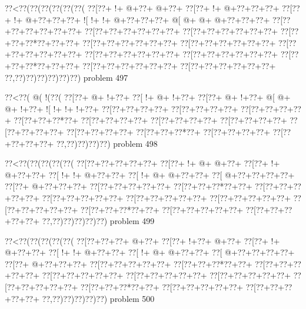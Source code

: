 \vbox{\vbox{\goo
\0??<\0??(\0??(\0??(\0??(\0??(\0??(
\0??[\0??+\- !+\- @+\0??+\- @+\0??+
\0??[\0??+\- !+\- @+\0??+\0??+\0??+
\0??[\0??+\- !+\- @+\0??+\0??+\0??+
\- ![\- !+\- !+\- @+\0??+\0??+\0??+
\- @[\- @+\- @+\- @+\0??+\0??+\0??+
\0??[\0??+\0??+\0??+\0??+\0??+\0??+
\0??[\0??+\0??+\0??+\0??+\0??+\0??+
\0??[\0??+\0??+\0??+\0??+\0??+\0??+
\0??[\0??+\0??+\0??*\0??+\0??+\0??+
\0??[\0??+\0??+\0??+\0??+\0??+\0??+
\0??[\0??+\0??+\0??+\0??+\0??+\0??+
\0??[\0??+\0??+\0??+\0??+\0??+\0??+
\0??[\0??+\0??+\0??+\0??+\0??+\0??+
\0??[\0??+\0??+\0??+\0??+\0??+\0??+
\0??[\0??+\0??+\0??*\0??+\0??+\0??+
\0??[\0??+\0??+\0??+\0??+\0??+\0??+
\0??[\0??+\0??+\0??+\0??+\0??+\0??+
\0??,\0??)\0??)\0??)\0??)\0??)\0??)
}
\hfil problem 497\hfil\break
}

\vbox{\vbox{\goo
\0??<\0??(\- @(\- !(\0??(
\0??[\0??+\- @+\- !+\0??+
\0??[\- !+\- @+\- !+\0??+
\0??[\0??+\- @+\- !+\0??+
\- @[\- @+\- @+\- !+\0??+
\- ![\- !+\- !+\- !+\0??+
\0??[\0??+\0??+\0??+\0??+
\0??[\0??+\0??+\0??+\0??+
\0??[\0??+\0??+\0??+\0??+
\0??[\0??+\0??+\0??*\0??+
\0??[\0??+\0??+\0??+\0??+
\0??[\0??+\0??+\0??+\0??+
\0??[\0??+\0??+\0??+\0??+
\0??[\0??+\0??+\0??+\0??+
\0??[\0??+\0??+\0??+\0??+
\0??[\0??+\0??+\0??*\0??+
\0??[\0??+\0??+\0??+\0??+
\0??[\0??+\0??+\0??+\0??+
\0??,\0??)\0??)\0??)\0??)
}
\hfil problem 498\hfil\break
}

\vbox{\vbox{\goo
\0??<\0??(\0??(\0??(\0??(\0??(
\0??[\0??+\0??+\0??+\0??+\0??+
\0??[\0??+\- !+\- @+\- @+\0??+
\0??[\0??+\- !+\- @+\0??+\0??+
\0??[\- !+\- !+\- @+\0??+\0??+
\0??[\- !+\- @+\- @+\0??+\0??+
\0??[\- @+\0??+\0??+\0??+\0??+
\0??[\0??+\- @+\0??+\0??+\0??+
\0??[\0??+\0??+\0??+\0??+\0??+
\0??[\0??+\0??+\0??*\0??+\0??+
\0??[\0??+\0??+\0??+\0??+\0??+
\0??[\0??+\0??+\0??+\0??+\0??+
\0??[\0??+\0??+\0??+\0??+\0??+
\0??[\0??+\0??+\0??+\0??+\0??+
\0??[\0??+\0??+\0??+\0??+\0??+
\0??[\0??+\0??+\0??*\0??+\0??+
\0??[\0??+\0??+\0??+\0??+\0??+
\0??[\0??+\0??+\0??+\0??+\0??+
\0??,\0??)\0??)\0??)\0??)\0??)
}
\hfil problem 499\hfil\break
}

\vbox{\vbox{\goo
\0??<\0??(\0??(\0??(\0??(\0??(
\0??[\0??+\0??+\0??+\- @+\0??+
\0??[\0??+\- !+\0??+\- @+\0??+
\0??[\0??+\- !+\- @+\0??+\0??+
\0??[\- !+\- !+\- @+\0??+\0??+
\0??[\- !+\- @+\- @+\0??+\0??+
\0??[\- @+\0??+\0??+\0??+\0??+
\0??[\0??+\- @+\0??+\0??+\0??+
\0??[\0??+\0??+\0??+\0??+\0??+
\0??[\0??+\0??+\0??*\0??+\0??+
\0??[\0??+\0??+\0??+\0??+\0??+
\0??[\0??+\0??+\0??+\0??+\0??+
\0??[\0??+\0??+\0??+\0??+\0??+
\0??[\0??+\0??+\0??+\0??+\0??+
\0??[\0??+\0??+\0??+\0??+\0??+
\0??[\0??+\0??+\0??*\0??+\0??+
\0??[\0??+\0??+\0??+\0??+\0??+
\0??[\0??+\0??+\0??+\0??+\0??+
\0??,\0??)\0??)\0??)\0??)\0??)
}
\hfil problem 500\hfil\break
}


